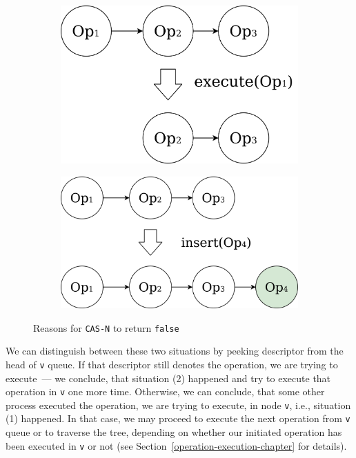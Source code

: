 \documentclass[times, dvipsnames,%
               languages={russian,english} %
              ]{itmo-student-thesis}
\begin{document}
\begin{figure}[H]
     \centering
     \begin{subfigure}[b]{0.40\linewidth}
          \centering
          \includegraphics[width=\linewidth]{pics/casn-fail-remove.png}
          \label{casn-fail-remove-pic}
     \end{subfigure}
     \hfill
     \begin{subfigure}[b]{0.50\linewidth}
          \centering
          \includegraphics[width=\linewidth]{pics/casn-fail-insert.png}
          \label{casn-fail-insert-pic}
     \end{subfigure}
    \caption{Reasons for \texttt{CAS-N} to return \texttt{false}}
    \label{casn-fail-pic}
\end{figure}

We can distinguish between these two situations by peeking descriptor from the head of \texttt{v} queue. If that descriptor still denotes the operation, we are trying to execute~--- we conclude, that situation (2) happened and try to execute that operation in \texttt{v} one more time. Otherwise, we can conclude, that some other process executed the operation, we are trying to execute, in node \texttt{v}, i.e., situation (1) happened. In that case, we may proceed to execute the next operation from \texttt{v} queue or to traverse the tree, depending on whether our initiated operation has been executed in \texttt{v} or not (see Section~\ref{operation-execution-chapter} for details).
\end{document}
